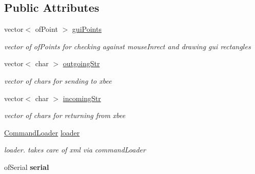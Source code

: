 \subsection*{Public Attributes}
\begin{DoxyCompactItemize}
\item 
\hypertarget{classtest_app_acf06dc19cef5db8e4fcc0e689764b7a1}{
vector$<$ ofPoint $>$ \hyperlink{classtest_app_acf06dc19cef5db8e4fcc0e689764b7a1}{guiPoints}}
\label{classtest_app_acf06dc19cef5db8e4fcc0e689764b7a1}

\begin{DoxyCompactList}\small\item\em vector of ofPoints for checking against mouseInrect and drawing gui rectangles \end{DoxyCompactList}\item 
\hypertarget{classtest_app_a993eeb1e801ab73e68548b61c9657571}{
vector$<$ char $>$ \hyperlink{classtest_app_a993eeb1e801ab73e68548b61c9657571}{outgoingStr}}
\label{classtest_app_a993eeb1e801ab73e68548b61c9657571}

\begin{DoxyCompactList}\small\item\em vector of chars for sending to xbee \end{DoxyCompactList}\item 
\hypertarget{classtest_app_a10589879c0a6b1f903147555828e56c8}{
vector$<$ char $>$ \hyperlink{classtest_app_a10589879c0a6b1f903147555828e56c8}{incomingStr}}
\label{classtest_app_a10589879c0a6b1f903147555828e56c8}

\begin{DoxyCompactList}\small\item\em vector of chars for returning from xbee \end{DoxyCompactList}\item 
\hypertarget{classtest_app_a84f94cf6e5fdf7b0c613d1a697721e96}{
\hyperlink{class_command_loader}{CommandLoader} \hyperlink{classtest_app_a84f94cf6e5fdf7b0c613d1a697721e96}{loader}}
\label{classtest_app_a84f94cf6e5fdf7b0c613d1a697721e96}

\begin{DoxyCompactList}\small\item\em loader. takes care of xml via commandLoader \end{DoxyCompactList}\item 
\hypertarget{classtest_app_a8103ee9f54c2adda499bf5b19c3ffebc}{
ofSerial {\bfseries serial}}
\label{classtest_app_a8103ee9f54c2adda499bf5b19c3ffebc}


\end{DoxyCompactItemize}
